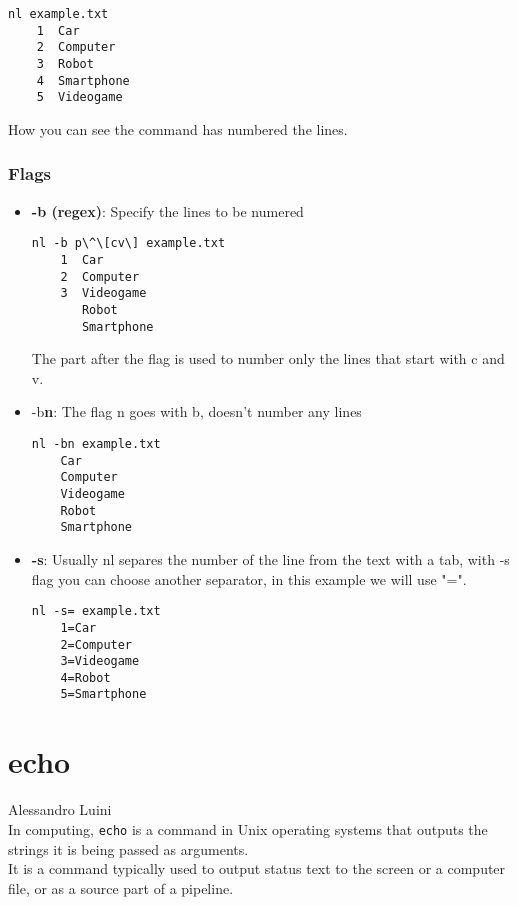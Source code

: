 \documentclass[hidelinks,12pt,a4paper,numbers=enddot]{scrartcl}
\begin{document}
\begin{verbatim}
nl example.txt
    1  Car
    2  Computer
    3  Robot
    4  Smartphone
    5  Videogame
\end{verbatim}

How you can see the command has numbered the lines.

\subsubsection{Flags}


\begin{itemize}
    \item  \textbf{-b (regex)}: Specify the lines to be numered
\begin{verbatim}
nl -b p\^\[cv\] example.txt
    1  Car
    2  Computer
    3  Videogame
       Robot
       Smartphone
\end{verbatim}
    The part after the flag is used to number only the lines that start with c and v.
    

    \item  -b\textbf{n}: The flag n goes with b, doesn't number any lines
\begin{verbatim}
nl -bn example.txt
    Car
    Computer
    Videogame
    Robot
    Smartphone
\end{verbatim}
    

  \item  \textbf{-s}: Usually nl separes the number of the line from the text with a tab, with -s
      flag you can choose another separator, in this example we will use "=".
\begin{verbatim}
nl -s= example.txt
    1=Car
    2=Computer
    3=Videogame
    4=Robot
    5=Smartphone
\end{verbatim}
    

\end{itemize}

\section{echo}


\large Alessandro Luini \normalsize\\



In computing, \texttt{echo} is a command in Unix operating systems that outputs the
strings it is being passed as arguments.\\

It is a command typically used to output status text to the screen or a
computer file, or as a source part of a pipeline.\\
\end{document}
